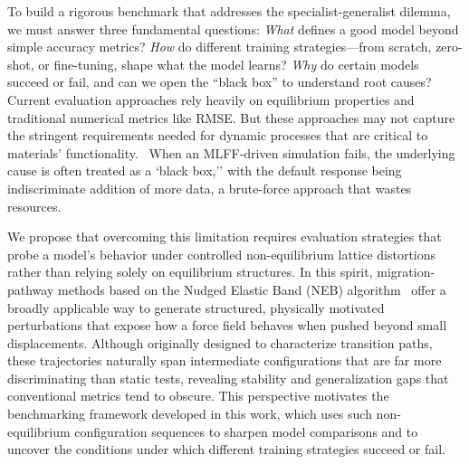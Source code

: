 \documentclass[pdflatex,sn-mathphys-num]{sn-jnl}%
\theoremstyle{thmstyleone}%
\theoremstyle{thmstyletwo}%
\theoremstyle{thmstylethree}%
\begin{document}
To build a rigorous benchmark that addresses the specialist-generalist dilemma, we must answer three fundamental questions: \textit{What} defines a good model beyond simple accuracy metrics? \textit{How} do different training strategies—from scratch, zero-shot, or fine-tuning, shape what the model learns? \textit{Why} do certain models succeed or fail, and can we open the ``black box'' to understand root causes? Current evaluation approaches rely heavily on equilibrium properties and traditional numerical metrics like RMSE. But these approaches may not capture the stringent requirements needed for dynamic processes that are critical to materials' functionality.~\citep{fu2022forces, mannan2025evaluating} When an MLFF-driven simulation fails, the underlying cause is often treated as a `black box,'' with the default response being indiscriminate addition of more data, a brute-force approach that wastes resources.

We propose that overcoming this limitation requires evaluation strategies that probe a model’s behavior under controlled non-equilibrium lattice distortions rather than relying solely on equilibrium structures. In this spirit, migration-pathway methods based on the Nudged Elastic Band (NEB) algorithm~\citep{miskin2025low, ruttinger_protocol_2022, cao2025migration, he2017origin,bheemaguli2026mlipBarriers} offer a broadly applicable way to generate structured, physically motivated perturbations that expose how a force field behaves when pushed beyond small displacements. Although originally designed to characterize transition paths, these trajectories naturally span intermediate configurations that are far more discriminating than static tests, revealing stability and generalization gaps that conventional metrics tend to obscure. This perspective motivates the benchmarking framework developed in this work, which uses such non-equilibrium configuration sequences to sharpen model comparisons and to uncover the conditions under which different training strategies succeed or fail.
\end{document}
